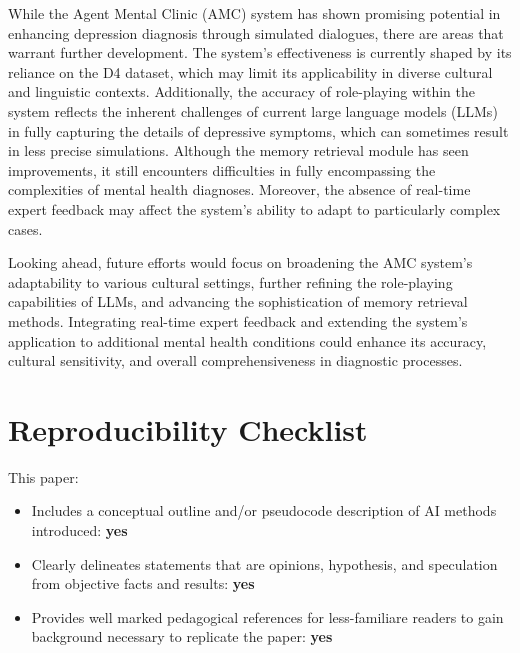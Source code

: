 While the Agent Mental Clinic (AMC) system has shown promising potential in enhancing depression diagnosis through simulated dialogues, there are areas that warrant further development. The system’s effectiveness is currently shaped by its reliance on the D4 dataset, which may limit its applicability in diverse cultural and linguistic contexts. Additionally, the accuracy of role-playing within the system reflects the inherent challenges of current large language models (LLMs) in fully capturing the details of depressive symptoms, which can sometimes result in less precise simulations. Although the memory retrieval module has seen improvements, it still encounters difficulties in fully encompassing the complexities of mental health diagnoses. Moreover, the absence of real-time expert feedback may affect the system's ability to adapt to particularly complex cases.

Looking ahead, future efforts would focus on broadening the AMC system's adaptability to various cultural settings, further refining the role-playing capabilities of LLMs, and advancing the sophistication of memory retrieval methods. Integrating real-time expert feedback and extending the system's application to additional mental health conditions could enhance its accuracy, cultural sensitivity, and overall comprehensiveness in diagnostic processes.









\section{Reproducibility Checklist}
This paper:
\begin{itemize}
    \item Includes a conceptual outline and/or pseudocode description of AI methods introduced: \textbf{yes}
    \item Clearly delineates statements that are opinions, hypothesis, and speculation from objective facts and results: \textbf{yes}
    \item Provides well marked pedagogical references for less-familiare readers to gain background necessary to replicate the paper: \textbf{yes}
\end{itemize}

